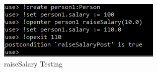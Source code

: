 \documentclass{article}
\begin{document}
	\begin{figure}[h]
		\includegraphics[width=\linewidth]{soil2.PNG}
		\caption{raiseSalary Testing}
		\label{fig:seq}
	\end{figure}
\end{document}
